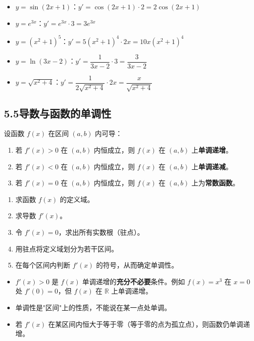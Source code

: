 \documentclass[12pt, a4paper]{ctexart}
\begin{document}
\begin{warnbox}[常见复合函数求导示例]
\begin{itemize}[leftmargin=2em]
  \item $y = \sin(2x + 1)$：$y' = \cos(2x+1) \cdot 2 = 2\cos(2x+1)$
  \item $y = e^{3x}$：$y' = e^{3x} \cdot 3 = 3e^{3x}$
  \item $y = (x^2 + 1)^5$：$y' = 5(x^2+1)^4 \cdot 2x = 10x(x^2+1)^4$
  \item $y = \ln(3x - 2)$：$y' = \dfrac{1}{3x-2} \cdot 3 = \dfrac{3}{3x-2}$
  \item $y = \sqrt{x^2 + 4}$：$y' = \dfrac{1}{2\sqrt{x^2+4}} \cdot 2x = \dfrac{x}{\sqrt{x^2+4}}$
\end{itemize}
\end{warnbox}

\subsection*{5.5\quad 导数与函数的单调性}

\begin{knowledgebox}[导数与单调性的关系]
设函数 $f(x)$ 在区间 $(a, b)$ 内可导：
\begin{enumerate}[leftmargin=2em]
  \item 若 $f'(x) > 0$ 在 $(a, b)$ 内恒成立，则 $f(x)$ 在 $(a, b)$ 上\textbf{单调递增}。
  \item 若 $f'(x) < 0$ 在 $(a, b)$ 内恒成立，则 $f(x)$ 在 $(a, b)$ 上\textbf{单调递减}。
  \item 若 $f'(x) = 0$ 在 $(a, b)$ 内恒成立，则 $f(x)$ 在 $(a, b)$ 上为\textbf{常数函数}。
\end{enumerate}
\end{knowledgebox}

\begin{knowledgebox}[求函数单调区间的步骤]
\begin{enumerate}[leftmargin=2em]
  \item 求函数 $f(x)$ 的定义域。
  \item 求导数 $f'(x)$。
  \item 令 $f'(x) = 0$，求出所有实数根（驻点）。
  \item 用驻点将定义域划分为若干区间。
  \item 在每个区间内判断 $f'(x)$ 的符号，从而确定单调性。
\end{enumerate}
\end{knowledgebox}

\begin{tipbox}[方法总结]
\begin{itemize}[leftmargin=2em]
  \item $f'(x) > 0$ 是 $f(x)$ 单调递增的\textbf{充分不必要}条件。例如 $f(x) = x^3$ 在 $x = 0$ 处 $f'(0) = 0$，但 $f(x)$ 在 $\mathbb{R}$ 上单调递增。
  \item 单调性是"区间"上的性质，不能说在某一点处单调。
  \item 若 $f'(x)$ 在某区间内恒大于等于零（等于零的点为孤立点），则函数仍单调递增。
\end{itemize}
\end{tipbox}
\end{document}
